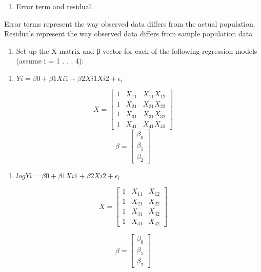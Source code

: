 \documentclass[
]{article}
\providecommand{\tightlist}{%
  \setlength{\itemsep}{0pt}\setlength{\parskip}{0pt}}
\begin{document}
\begin{enumerate}
\def\labelenumi{\roman{enumi}.}
\setcounter{enumi}{2}
\tightlist
\item
  Error term and residual.
\end{enumerate}

Error terms represent the way observed data differs from the actual
population. Residuals represent the way observed data differs from
sample population data

\begin{enumerate}
\def\labelenumi{(\alph{enumi})}
\setcounter{enumi}{2}
\tightlist
\item
  Set up the X matrix and β vector for each of the following regression
  models (assume i = 1 . . . 4):
\end{enumerate}

\begin{enumerate}
\def\labelenumi{\roman{enumi}.}
\tightlist
\item
  \(Yi = β0 + β1Xi1 + β2Xi1Xi2 + \epsilon_i\)
\end{enumerate}

\[X = \begin{bmatrix} 1 & X_{11} & X_{11}X_{12} \\ 1 & X_{21} & X_{21}X_{22} \\ 1 & X_{31} & X_{31}X_{32} \\ 1 & X_{41} & X_{41}X_{42} \end{bmatrix}\]
\[\beta = \begin{bmatrix} \beta_0 \\ \beta_1 \\ \beta_2 \end{bmatrix}\]

\begin{enumerate}
\def\labelenumi{\roman{enumi}.}
\setcounter{enumi}{1}
\tightlist
\item
  \(logYi = β0 + β1Xi1 + β2Xi2 + \epsilon_i\)
\end{enumerate}

\[X = \begin{bmatrix} 1 & X_{11} & X_{12} \\ 1 & X_{21} & X_{22} \\ 1 & X_{31} & X_{32} \\ 1 & X_{41} & X_{42} \end{bmatrix}\]

\[\beta = \begin{bmatrix} \beta_0 \\ \beta_1 \\ \beta_2 \end{bmatrix}\]
\end{document}
